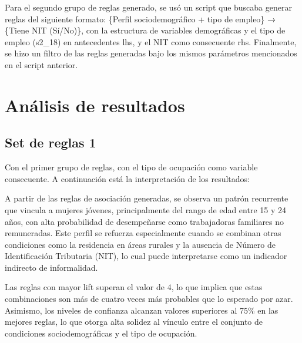 \documentclass[Royal,times,sageh]{sagej}
\begin{document}
Para el segundo grupo de reglas generado, se usó un script que buscaba
generar reglas del siguiente formato: \{Perfil sociodemográfico + tipo
de empleo\} → \{Tiene NIT (Sí/No)\}, con la estructura de variables
demográficas y el tipo de empleo (s2\_18) en antecedentes lhs, y el NIT
como consecuente rhs. Finalmente, se hizo un filtro de las reglas
generadas bajo los mismos parámetros mencionados en el script anterior.

\section{Análisis de resultados}\label{anuxe1lisis-de-resultados}

\subsection{Set de reglas 1}\label{set-de-reglas-1}

Con el primer grupo de reglas, con el tipo de ocupación como variable
consecuente. A continuación está la interpretación de los resultados:

A partir de las reglas de asociación generadas, se observa un patrón
recurrente que vincula a mujeres jóvenes, principalmente del rango de
edad entre 15 y 24 años, con alta probabilidad de desempeñarse como
trabajadoras familiares no remuneradas. Este perfil se refuerza
especialmente cuando se combinan otras condiciones como la residencia en
áreas rurales y la ausencia de Número de Identificación Tributaria
(NIT), lo cual puede interpretarse como un indicador indirecto de
informalidad.

Las reglas con mayor lift superan el valor de 4, lo que implica que
estas combinaciones son más de cuatro veces más probables que lo
esperado por azar. Asimismo, los niveles de confianza alcanzan valores
superiores al 75\% en las mejores reglas, lo que otorga alta solidez al
vínculo entre el conjunto de condiciones sociodemográficas y el tipo de
ocupación.
\end{document}
